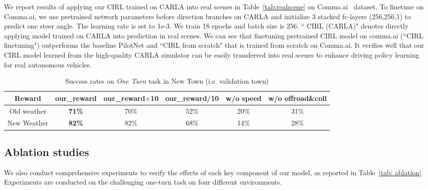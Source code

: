 \documentclass[runningheads]{llncs}
\begin{document}
We report results of applying our CIRL trained on CARLA into real scenes in Table~\ref{tab:realscene} on  Comma.ai~\cite{santana2016learning} dataset. To finetune on Comma.ai, we use pretrained network parameters before direction branches on CARLA and initialize 3 stacked fc-layers (256,256,1) to predict one steer angle. The learning rate is set to 1e-3. We train 18 epochs and batch size is 256. `` CIRL (CARLA)" denotes directly applying model trained on CARLA into prediction in real scenes. We can see that finetuning pretrained CIRL model on comma.ai (``CIRL finetuning") outperforms the baseline PilotNet and ``CIRL from scratch" that is trained from scratch on Comma.ai. It verifies well that our CIRL model learned from the high-quality CARLA simulator can be easily transferred into real scenes to enhance driving policy learning for real autonomous vehicles.

\begin{table}[t]
\centering
\caption{Success rates on \emph{One Turn} task in New Town (i.e. validation town)}\label{tab:reward}\footnotesize\vspace{-3mm}
\begin{tabular}{c|c|c|c|c|c}
\hline
\textbf{Reward} & our\_reward & our\_reward$\times$10 & our\_reward/10 & w/o speed & w/o offroad\&coll\\ 
\hline
Old weather & \textbf{71\%} & 70\% & 52\% & 20\%          & 31\%\\
\hline
New Weather & \textbf{82\%} & 82\% & 68\% & 14\% & 28\%\\
\hline
\end{tabular}\vspace{-6mm}
\end{table}
    
\subsection{Ablation studies}
We also conduct comprehensive experiments to verify the effects of each key component of our model, as reported in Table~\ref{tab: ablation}. Experiments are conducted on the challenging one-turn task on four different environments.
\end{document}
